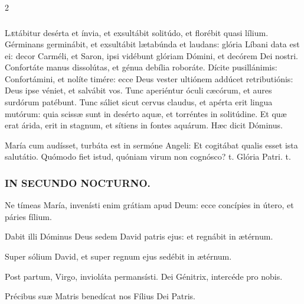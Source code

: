 \documentclass[9pt,twoside]{extarticle}
\begin{document}
\begin{multicols}{2}
\subsubsection*{}
\lettrine{L}ætábitur desérta et ínvia, et exsultábit solitúdo, et florébit quasi lílium.
Gérminans germinábit, et exsultábit lætabúnda et laudans: glória Líbani data est ei: decor Carméli, et Saron, ipsi vidébunt glóriam Dómini, et decórem Dei nostri.
Confortáte manus dissolútas, et génua debília roboráte.
Dícite pusillánimis: Confortámini, et nolíte timére: ecce Deus vester ultiónem addúcet retributiónis: Deus ipse véniet, et salvábit vos.
Tunc aperiéntur óculi cæcórum, et aures surdórum patébunt.
Tunc sáliet sicut cervus claudus, et apérta erit lingua mutórum: quia scissæ sunt in desérto aquæ, et torréntes in solitúdine.
Et quæ erat árida, erit in stagnum, et sítiens in fontes aquárum. Hæc dicit Dóminus.

\begin{tightlist}{}
\item {} María cum audísset, turbáta est in sermóne Angeli: \textred{*} Et cogitábat qualis esset ista salutátio.  Quómodo fiet istud, quóniam virum non cognósco? t. Glória Patri. t.
\end{tightlist}

\subsubsection*{\center \textsc{IN SECUNDO NOCTURNO.}}
\begin{tightlist}{}
\item {} Ne tímeas María, invenísti enim grátiam apud Deum: ecce concípies in útero, et páries fílium.
\item {} Dabit illi Dóminus Deus sedem David patris ejus: et regnábit in ætérnum.
\item {} Super sólium David, et super regnum ejus sedébit in ætérnum.
\item {} Post partum, Virgo, invioláta permansísti.  Dei Génitrix, intercéde pro nobis.
\item {\small {} Précibus suæ Matris benedícat nos Fílius Dei Patris.}
\end{tightlist}


\end{multicols}
\end{document}
